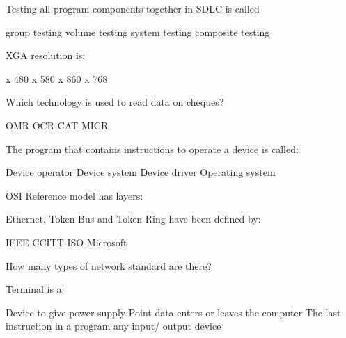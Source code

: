 \documentclass{exam}
\begin{document}
\begin{questions}
Testing all program components together in  SDLC is called\\
\begin{oneparchoices}
\choice group testing
\choice volume testing
\choice system testing
\choice composite testing
\end{oneparchoices}
\question 

XGA resolution is:\\
\begin{oneparchoices}
 x 480
 x 580
 x 860
 x 768
\end{oneparchoices}
\question 

Which technology is used to read data on cheques?\\
\begin{oneparchoices}
\choice OMR
\choice OCR
\choice CAT
\choice MICR
\end{oneparchoices}
\question 

The program that contains instructions to operate a device is called:\\
\begin{oneparchoices}
\choice Device operator
\choice Device system
\choice Device driver
\choice Operating system
\end{oneparchoices}
\question 

OSI Reference model has layers:\\
\begin{oneparchoices}
\end{oneparchoices}
\question 

Ethernet, Token Bus and Token Ring have been defined by:\\
\begin{oneparchoices}
\choice IEEE
\choice CCITT
\choice ISO
\choice Microsoft
\end{oneparchoices}
\question 

How many types of network standard are there?\\
\begin{oneparchoices}
\end{oneparchoices}
\question 

Terminal is a:\\
\begin{oneparchoices}
\choice Device to give power supply
\choice Point data enters or leaves the computer
\choice The last instruction in a program
\choice any input/ output device
\end{oneparchoices}
\question 


\end{questions}
\end{document}
